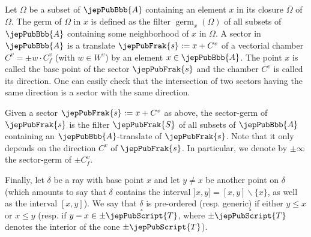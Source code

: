 Let $\Omega$ be a subset of $\jepPubBbb{A}$ containing an element $x$ in its closure $\overline{\Omega}$ of $\Omega$. The germ of $\Omega$ in $x$ is defined as the filter $\operatorname{germ}_x(\Omega)$ of all subsets of $\jepPubBbb{A}$ containing some neighborhood of $x$ in $\Omega$. A sector in $\jepPubBbb{A}$ is a translate $\jepPubFrak{s}:=x+C^v$ of a vectorial chamber $C^v=\pm w\cdot C_f^v$ (with $w\in W^v$) by an element $x\in\jepPubBbb{A}$. The point $x$ is called the base point of the sector $\jepPubFrak{s}$ and the chamber $C^v$ is called its direction. One can easily check that the intersection of two sectors having the same direction is a sector with the same direction.

Given a sector $\jepPubFrak{s}:=x+C^v$ as above, the sector-germ of $\jepPubFrak{s}$ is the filter $\jepPubFrak{S}$ of all subsets of $\jepPubBbb{A}$ containing an $\jepPubBbb{A}$-translate of $\jepPubFrak{s}$. Note that it only depends on the direction $C^v$ of $\jepPubFrak{s}$. In particular, we denote by $\pm\infty$ the sector-germ of $\pm C_f^v$.

Finally, let $\delta$ be a ray with base point $x$ and let $y\neq x$ be another point on $\delta$ (which amounts to say that $\delta$ contains the interval $]x,y]=[x,y]\smallsetminus\{x\}$, as well as the interval $[x,y]$). We say that $\delta$ is pre-ordered (resp. generic) if either $y\leqslant x$ or $x\leqslant y$ (resp. if $y-x\in\pm\mathring{\jepPubScript{T}}$, where $\pm\mathring{\jepPubScript{T}}$ denotes the interior of the cone $\pm\jepPubScript{T}$).
